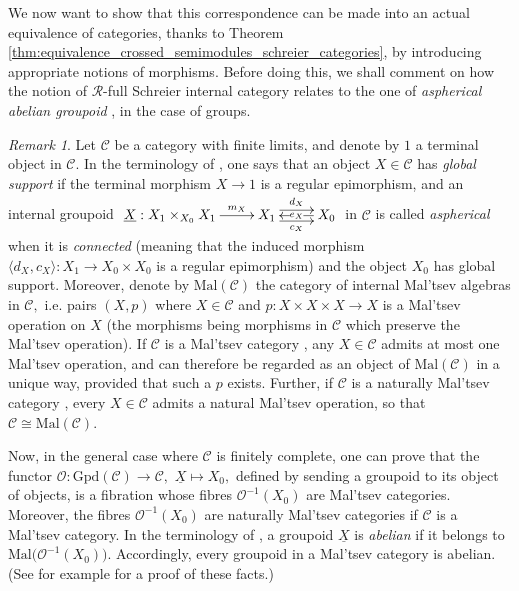 \documentclass[a4paper]{amsart}
\theoremstyle{plain}
\theoremstyle{definition}
\theoremstyle{remark}
\newtheorem{remark}[subsection]{Remark}
\newcommand{\la}{\langle}
\newcommand{\ra}{\rangle}
\begin{document}
We now want to show that this correspondence can be made into an actual equivalence of categories, thanks to Theorem \ref{thm:equivalence_crossed_semimodules_schreier_categories}, by introducing appropriate notions of morphisms. Before doing this, we shall comment on how the notion of $\mathcal{R}$-full Schreier internal category relates to the one of  \emph{aspherical abelian groupoid} \cite{aspherical}, in the case of groups.
\begin{remark}
\label{rmk:aspherical_groupoids}
Let $\mathcal{C}$ be a category with finite limits, and denote by $1$ a terminal object in $\mathcal{C}.$ In the terminology of \cite{bourn-direction, aspherical}, one says that an object $X\in\mathcal{C}$ has \emph{global support} if the terminal morphism $X\longrightarrow1$ is a regular epimorphism, and an internal groupoid $\xymatrix{{\underline{X}: X_1\times_{X_0}X_1} \ar[r]^-{m_X} &{X_1} \ar@<.9ex>[r]^-{d_X} \ar@<-.9ex>[r]_-{c_X} &{X_0} \ar[l]|-{e_X}}$ in $\mathcal{C}$ is called \emph{aspherical} when it is \emph{connected} (meaning that the induced morphism $\la d_X,c_X\ra\colon X_1\longrightarrow X_0\times X_0$ is a regular epimorphism) and the object $X_0$ has global support. Moreover, denote by $\mathrm{Mal}(\mathcal{C})$ the category of internal Mal'tsev algebras in $\mathcal{C},$ i.e. pairs $(X,p)$ where $X\in\mathcal{C}$ and $p\colon X\times X\times X\rightarrow X$ is a Mal'tsev operation on $X$ (the morphisms being morphisms in $\mathcal{C}$ which preserve the Mal'tsev operation). If $\mathcal{C}$ is a Mal'tsev category \cite{CLP}, any $X\in\mathcal{C}$ admits at most one Mal'tsev operation, and can therefore be regarded as an object of $\mathrm{Mal}(\mathcal{C})$ in a unique way, provided that such a $p$ exists. Further, if $\mathcal{C}$ is a naturally Mal'tsev category \cite{johnstone}, every $X\in\mathcal{C}$ admits a natural Mal'tsev operation, so that $\mathcal{C}\cong\mathrm{Mal}(\mathcal{C}).$

 Now, in the general case where $\mathcal{C}$ is finitely complete, one can prove that the functor $\mathcal{O}\colon\mathrm{Gpd}(\mathcal{C})\rightarrow\mathcal{C},$ $\underline{X}\mapsto X_0,$ defined by sending a groupoid to its object of objects, is a fibration whose fibres $\mathcal{O}^{-1}(X_0)$ are Mal'tsev categories. Moreover, the fibres $\mathcal{O}^{-1}(X_0)$ are naturally Mal'tsev categories if $\mathcal{C}$ is a Mal'tsev category. In the terminology of \cite{aspherical}, a groupoid $\underline{X}$ is \emph{abelian} if it belongs to $\mathrm{Mal}\big(\mathcal{O}^{-1}(X_0)\big).$ Accordingly, every groupoid in a Mal'tsev category is abelian. (See for example \cite[Section 2.11]{borceux-bourn} for a proof of these facts.)


\end{remark}
\end{document}
